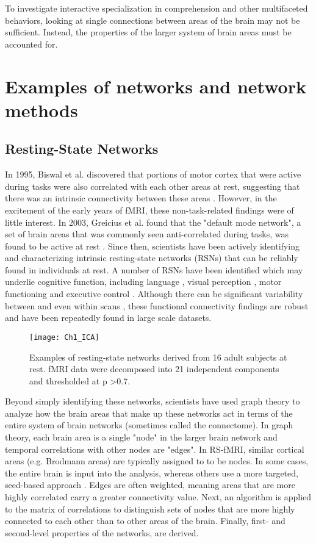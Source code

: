 To investigate interactive specialization in comprehension and other multifaceted behaviors, looking at single connections between areas of the brain may not be sufficient. Instead, the properties of the larger system of brain areas must be accounted for. 

\section{Examples of networks and network methods}

\subsection{Resting-State Networks}
In 1995, Biswal et al. discovered that portions of motor cortex that were active during tasks were also correlated with each other areas at rest, suggesting that there was an intrinsic connectivity between these areas \cite{Biswal1995}. However, in the excitement of the early years of fMRI, these non-task-related findings were of little interest. In 2003, Greicius et al. found that the "default mode network", a set of brain areas that was commonly seen anti-correlated during tasks, was found to be active at rest \cite{Greicius2003}. Since then, scientists have been actively identifying and characterizing intrinsic resting-state networks (RSNs) that can be reliably found in individuals at rest. A number of RSNs have been identified which may underlie cognitive function, including language \cite{Cordes2000, Hampson2002}, visual perception \cite{Cordes2000, Simmons2012}, motor functioning \cite{Biswal1995} and executive control \cite{Seeley2007, Simmons2012}. Although there can be significant variability between and even within scans \cite{Honey2009}, these functional connectivity findings are robust and have been repeatedly found in large scale datasets.

\begin{figure}[t]
    \centering
    \texttt{[image: Ch1\_ICA]}
    \caption[Examples of resting-state networks.]{Examples of resting-state networks derived from 16 adult subjects at rest. fMRI data were decomposed into 21 independent components and thresholded at p \textgreater 0.7.} 
\end{figure}

Beyond simply identifying these networks, scientists have used graph theory to analyze how the brain areas that make up these networks act in terms of the entire system of brain networks (sometimes called the connectome). In graph theory, each brain area is a single "node" in the larger brain network and temporal correlations with other nodes are "edges". In RS-fMRI, similar cortical areas (e.g. Brodmann areas) are typically assigned to to be nodes. In some cases, the entire brain is input into the analysis, whereas others use a more targeted, seed-based approach \cite{Vogel2010}.  Edges are often weighted, meaning areas that are more highly correlated carry a greater connectivity value. Next, an algorithm is applied to the matrix of correlations to distinguish sets of nodes that are more highly connected to each other than to other areas of the brain. Finally, first- and second-level properties of the networks, are derived.

